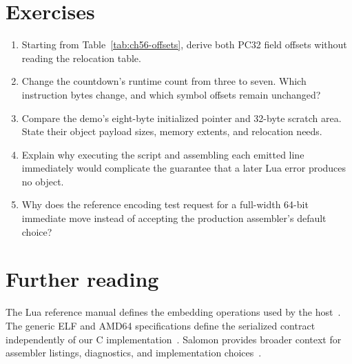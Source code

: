 \section{Exercises}
\label{sec:ch56-exercises}
\begin{enumerate}
\item\label{ex:ch56-field} Starting from Table~\ref{tab:ch56-offsets}, derive both PC32 field offsets without reading the relocation table.
\item\label{ex:ch56-counter} Change the countdown's runtime count from three to seven. Which instruction bytes change, and which symbol offsets remain unchanged?
\item\label{ex:ch56-size} Compare the demo's eight-byte initialized pointer and 32-byte scratch area. State their object payload sizes, memory extents, and relocation needs.
\item\label{ex:ch56-script-error} Explain why executing the script and assembling each emitted line immediately would complicate the guarantee that a later Lua error produces no object.
\item\label{ex:ch56-differential} Why does the reference encoding test request  for a full-width 64-bit immediate move instead of accepting the production assembler's default choice?
\end{enumerate}

\section{Further reading}
\label{sec:ch56-reading}
The Lua reference manual defines the embedding operations used by the host~\cite{ierusalimschy-2026-lua}.
The generic ELF and AMD64 specifications define the serialized contract independently of our C implementation~\cite{xinuos-2026-elf,matz-2012-amd64}.
Salomon provides broader context for assembler listings, diagnostics, and implementation choices~\cite{salomon-1993-assemblers}.
